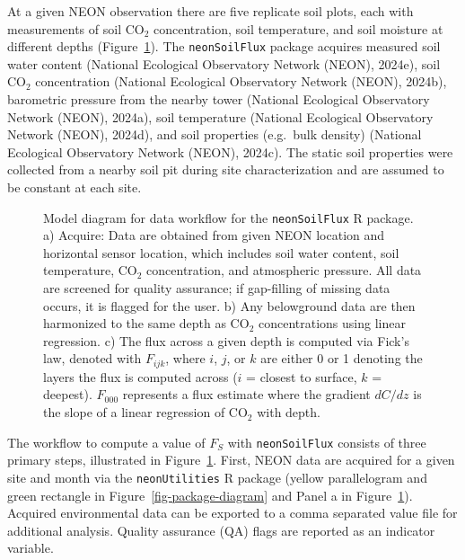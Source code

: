 \documentclass[
  letterpaper,
  DIV=11,
  numbers=noendperiod]{scrartcl}
\begin{document}
At a given NEON observation there are five replicate soil plots, each
with measurements of soil CO\(_{2}\) concentration, soil temperature,
and soil moisture at different depths (Figure~\ref{fig-model-diagram}).
The \texttt{neonSoilFlux} package acquires measured soil water content
(National Ecological Observatory Network (NEON), 2024e), soil CO\(_{2}\)
concentration (National Ecological Observatory Network (NEON), 2024b),
barometric pressure from the nearby tower (National Ecological
Observatory Network (NEON), 2024a), soil temperature (National
Ecological Observatory Network (NEON), 2024d), and soil properties
(e.g.~bulk density) (National Ecological Observatory Network (NEON),
2024c). The static soil properties were collected from a nearby soil pit
during site characterization and are assumed to be constant at each
site.

\begin{figure}


\caption{\label{fig-model-diagram}Model diagram for data workflow for
the \texttt{neonSoilFlux} R package. a) Acquire: Data are obtained from
given NEON location and horizontal sensor location, which includes soil
water content, soil temperature, CO\(_{2}\) concentration, and
atmospheric pressure. All data are screened for quality assurance; if
gap-filling of missing data occurs, it is flagged for the user. b) Any
belowground data are then harmonized to the same depth as CO\(_{2}\)
concentrations using linear regression. c) The flux across a given depth
is computed via Fick's law, denoted with \(F_{ijk}\), where \(i\),
\(j\), or \(k\) are either 0 or 1 denoting the layers the flux is
computed across (\(i\) = closest to surface, \(k\) = deepest).
\(F_{000}\) represents a flux estimate where the gradient \(dC/dz\) is
the slope of a linear regression of CO\(_{2}\) with depth.}

\end{figure}%

The workflow to compute a value of \(F_{S}\) with \texttt{neonSoilFlux}
consists of three primary steps, illustrated in
Figure~\ref{fig-model-diagram}. First, NEON data are acquired for a
given site and month via the \texttt{neonUtilities} R package (yellow
parallelogram and green rectangle in Figure~\ref{fig-package-diagram}
and Panel a in Figure~\ref{fig-model-diagram}). Acquired environmental
data can be exported to a comma separated value file for additional
analysis. Quality assurance (QA) flags are reported as an indicator
variable.
\end{document}
